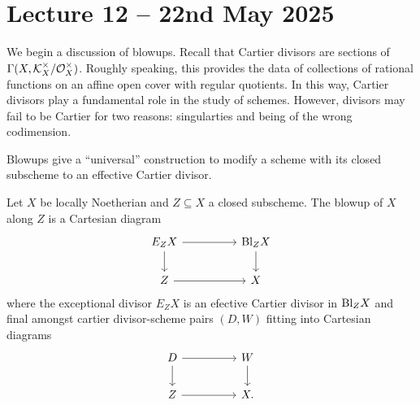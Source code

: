 \section{Lecture 12 -- 22nd May 2025}\label{sec: lecture 12}
We begin a discussion of blowups. Recall that Cartier divisors are sections of $\Gamma(X,\mathcal{K}_{X}^{\times}/\mathcal{O}_{X}^{\times})$. Roughly speaking, this provides the data of collections of rational functions on an affine open cover with regular quotients. In this way, Cartier divisors play a fundamental role in the study of schemes. However, divisors may fail to be Cartier for two reasons: singularties and being of the wrong codimension. 

Blowups give a ``universal'' construction to modify a scheme with its closed subscheme to an effective Cartier divisor. 
\begin{definition}[Blowup]\label{def: blowup}
    Let $X$ be locally Noetherian and $Z\subseteq X$ a closed subscheme. The blowup of $X$ along $Z$ is a Cartesian diagram 
    $$%
    \begin{tikzcd}
        {E_{Z}X} && {\Bl_{Z}X} \\
        Z && X
        \arrow[from=1-1, to=1-3]
        \arrow[from=1-1, to=2-1]
        \arrow[from=1-3, to=2-3]
        \arrow[from=2-1, to=2-3]
    \end{tikzcd}$$
    where the exceptional divisor $E_{Z}X$ is an efective Cartier divisor in $\mathrm{Bl}_{Z}X$ and final amongst cartier divisor-scheme pairs $(D,W)$ fitting into Cartesian diagrams 
    $$%
    \begin{tikzcd}
        D && W \\
        Z && {X.}
        \arrow[from=1-1, to=1-3]
        \arrow[from=1-1, to=2-1]
        \arrow[from=1-3, to=2-3]
        \arrow[from=2-1, to=2-3]
    \end{tikzcd}$$
\end{definition}
